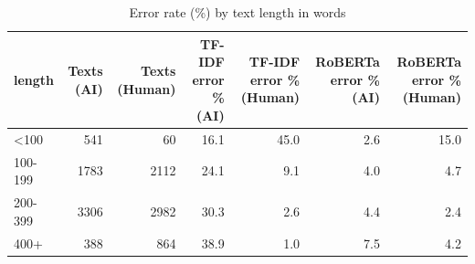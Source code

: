 \begin{table}[!t]
\centering
\caption{Error rate (\%) by text length in words}
\label{tab:errors_by_length}
\footnotesize
\begin{tabular}{lrrrrrr}
\toprule
\textbf{length} & \textbf{Texts (AI)} & \textbf{Texts (Human)} & \textbf{TF-IDF error \% (AI)} & \textbf{TF-IDF error \% (Human)} & \textbf{RoBERTa error \% (AI)} & \textbf{RoBERTa error \% (Human)} \\
\midrule
<100 & 541 & 60 & 16.1 & 45.0 & 2.6 & 15.0 \\
100-199 & 1783 & 2112 & 24.1 & 9.1 & 4.0 & 4.7 \\
200-399 & 3306 & 2982 & 30.3 & 2.6 & 4.4 & 2.4 \\
400+ & 388 & 864 & 38.9 & 1.0 & 7.5 & 4.2 \\
\bottomrule
\end{tabular}
\end{table}
